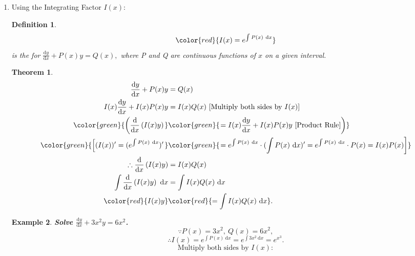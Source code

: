 \documentclass[12pt, a4paper]{article}
\newtheorem{theorem}{Theorem}[subsection]
\newtheorem{definition}{Definition}[subsection]
\newtheorem{example}{Example}[subsection]
\def\d{{\mathrm{d}}}
\begin{document}
\begin{enumerate}
\begin{example}
        $$\text{Assume }v=\frac{y}{x}:\ y=vx\ \Rightarrow\ \frac{\d y}{\d x}=\frac{\d v}{\d x}x+v.$$
        $$\begin{aligned}
            \frac{\d y}{\d x}=1+v&=\frac{\d v}{\d x}x+v\\
            \d v&=\frac{1}{x}\ \d x\\
            \int\ \d v&=\int \frac{1}{x}\ \d x\\
            v&=\ln|x|+C=\ln|Ax|\\
            \frac{y}{x}&=\ln|Ax|\\
            y&=x\ln|Ax|.
        \end{aligned}$$ 
    \end{example}
    \item Using the Integrating Factor $I(x)$: 
    \begin{definition}
        $${\color{red}{I(x)=e^{\int P(x)\ \d x}}}$$
        is the \textbf{\color{red}{integrating factor}} for $\frac{\d y}{\d x}+P(x)y=Q(x),$ where P and Q are continuous functions of $x$ on a given interval. 
    \end{definition}
    \begin{theorem}
        $$\begin{aligned}
            \frac{\d y}{\d x}+P(x)y&=Q(x)\\
            I(x)\frac{\d y}{\d x}+I(x)P(x)y&=I(x)Q(x)\ [\text{Multiply both sides by }I(x)]\\
            {\color{green}{\left(\frac{\d}{\d x}\left(I(x)y\right)\right.}}&{\color{green}{\left.=I(x)\frac{\d y}{\d x}+I(x)P(x)y\ [\text{Product Rule}]\right)}}\\
            {\color{green}{\left[(I(x))'=(e^{\int P(x)\ \d x})'\right.}}&{\color{green}{\left.=e^{\int P(x)\ \d x}\cdot (\int P(x)\ \d x)'=e^{\int P(x)\ \d x}\cdot P(x)=I(x)P(x)\right]}}\\
            \therefore \frac{\d}{\d x}\left(I(x)y\right)&=I(x)Q(x)\\
            \int \frac{\d}{\d x}\left(I(x)y\right)\ \d x&=\int I(x)Q(x)\ \d x\\
            {\color{red}{I(x)y}}&{\color{red}{=\int I(x)Q(x)\ \d x}}.
        \end{aligned}$$
    \end{theorem}
    \begin{example}
        \textbf{Solve $\frac{\d y}{\d x}+3x^2y=6x^2$.}
        $$\because P(x)=3x^2,\ Q(x)=6x^2,$$
        $$\therefore I(x)=e^{\int P(x)\ \d x}=e^{\int 3x^2\ \d x}=e^{x^3}.$$
        $$\text{Multiply both sides by }I(x): $$

\end{example}
\end{enumerate}
\end{document}
